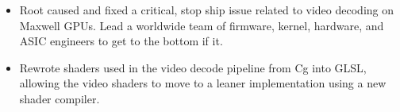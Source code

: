 \begin{itemize} \itemsep -2pt

\item Root caused and fixed a critical, stop ship issue related to video
      decoding on Maxwell GPUs. Lead a worldwide team of  firmware, kernel,
      hardware, and ASIC engineers to get to the bottom if it.

\item Rewrote shaders used in the video decode pipeline from Cg into GLSL,
      allowing the video shaders to move to a leaner implementation using
      a new shader compiler.









\end{itemize}
